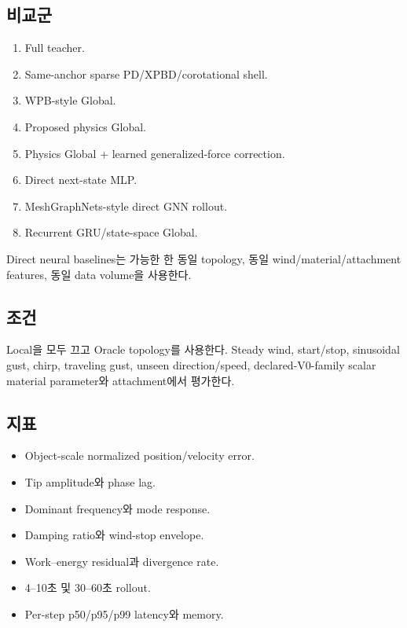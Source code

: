 \documentclass[11pt,a4paper]{article}
\begin{document}
\subsection*{비교군}

\begin{enumerate}[leftmargin=1.7em]
  \item Full teacher.
  \item Same-anchor sparse PD/XPBD/corotational shell.
  \item WPB-style Global.
  \item Proposed physics Global.
  \item Physics Global + learned generalized-force correction.
  \item Direct next-state MLP.
  \item MeshGraphNets-style direct GNN rollout.
  \item Recurrent GRU/state-space Global.
\end{enumerate}

Direct neural baselines는 가능한 한 동일 topology,
동일 wind/material/attachment features, 동일 data volume을 사용한다.

\subsection*{조건}

Local을 모두 끄고 Oracle topology를 사용한다.
Steady wind, start/stop, sinusoidal gust, chirp, traveling gust,
unseen direction/speed, declared-V0-family scalar material parameter와 attachment에서 평가한다.

\subsection*{지표}

\begin{itemize}[leftmargin=1.5em]
  \item Object-scale normalized position/velocity error.
  \item Tip amplitude와 phase lag.
  \item Dominant frequency와 mode response.
  \item Damping ratio와 wind-stop envelope.
  \item Work--energy residual과 divergence rate.
  \item 4--10초 및 30--60초 rollout.
  \item Per-step p50/p95/p99 latency와 memory.
\end{itemize}
\end{document}
